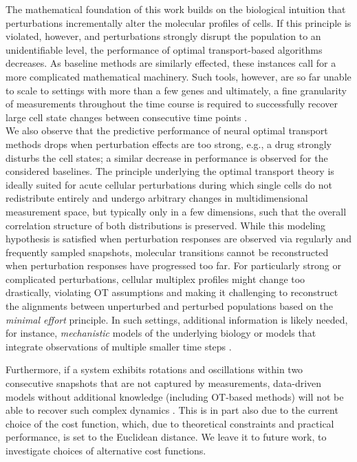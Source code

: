 The mathematical foundation of this work builds on the biological intuition that perturbations incrementally alter the molecular profiles of cells. 
If this principle is violated, however, and perturbations strongly disrupt the population to an unidentifiable level, the performance of optimal transport-based algorithms decreases. As baseline methods are similarly effected, these instances call for a more complicated mathematical machinery.
Such tools, however, are so far unable to scale to settings with more than a few genes \citep{heydari2022iqcell} and ultimately, a fine granularity of measurements throughout the time course is required to successfully recover large cell state changes between consecutive time points \citep{tritschler2019concepts}. \\

We also observe that the predictive performance of neural optimal transport methods drops when perturbation effects are too strong, e.g., a drug strongly disturbs the cell states; a similar decrease in performance is observed for the considered baselines.
The principle underlying the optimal transport theory is ideally suited for acute cellular perturbations during which single cells do not redistribute entirely and undergo arbitrary changes in multidimensional measurement space, but typically only in a few dimensions, such that the overall correlation structure of both distributions is preserved. While this modeling hypothesis is satisfied when perturbation responses are observed via regularly and frequently sampled snapshots, molecular transitions cannot be reconstructed when perturbation responses have progressed too far. For particularly strong or complicated perturbations, cellular multiplex profiles might change too drastically, violating OT assumptions and making it challenging to reconstruct the alignments between unperturbed and perturbed populations based on the \emph{minimal effort} principle.
In such settings, additional information is likely needed, for instance, \emph{mechanistic} models of the underlying biology or models that integrate observations of multiple smaller time steps \citep{raue2015data2dynamics, busch2015fundamental}. 

Furthermore, if a system exhibits rotations and oscillations within two consecutive snapshots that are not captured by measurements, data-driven models without additional knowledge (including OT-based methods) will not be able to recover such complex dynamics \citep{weinreb2018fundamental}. This is in part also due to the current choice of the cost function, which, due to theoretical constraints and practical performance, is set to the Euclidean distance. We leave it to future work, to investigate choices of alternative cost functions. 


